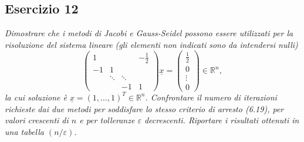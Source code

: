 \subsection{Esercizio 12}
\label{sub:es12}
\emph{Dimostrare che i metodi di Jacobi e Gauss-Seidel possono essere utilizzati per la risoluzione del sistema lineare (gli elementi non indicati sono da intendersi nulli)
			\[
				\begin{pmatrix}
					1 & & & -\frac{1}{2}\\
					-1 & 1 & &\\
					& \ddots & \ddots &\\
					& & -1 & 1
				\end{pmatrix}\underline{x}=\begin{pmatrix}
					\frac{1}{2}\\
					0\\
					\vdots\\
					0
				\end{pmatrix}\in\mathbb{R}^n,
			\]
			la cui soluzione è $\underline{x}=(1,\dots,1)^T\in\mathbb{R}^n$.
      Confrontare il numero di iterazioni richieste dai due metodi per soddisfare lo stesso criterio di arresto (6.19),
      per valori crescenti di $n$ e per tolleranze $\varepsilon$ decrescenti. Riportare i risultati ottenuti in una tabella $(n/\varepsilon)$.
      }
